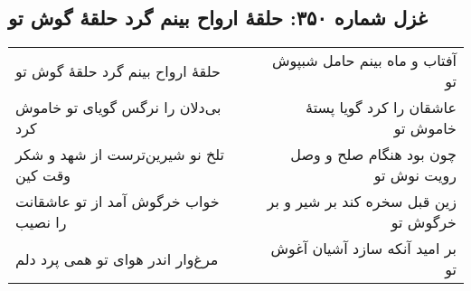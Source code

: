 \begin{center}
\section*{غزل شماره ۳۵۰: حلقهٔ ارواح بینم گرد حلقهٔ گوش تو}
\label{sec:350}
\begin{longtable}{l p{0.5cm} r}
حلقهٔ ارواح بینم گرد حلقهٔ گوش تو
&&
آفتاب و ماه بینم حامل شبپوش تو
\\
بی‌دلان را نرگس گویای تو خاموش کرد
&&
عاشقان را کرد گویا پستهٔ خاموش تو
\\
تلخ نو شیرین‌ترست از شهد و شکر وقت کین
&&
چون بود هنگام صلح و وصل رویت نوش تو
\\
خواب خرگوش آمد از تو عاشقانت را نصیب
&&
زین قبل سخره کند بر شیر و بر خرگوش تو
\\
مرغ‌وار اندر هوای تو همی پرد دلم
&&
بر امید آنکه سازد آشیان آغوش تو
\\
\end{longtable}
\end{center}
